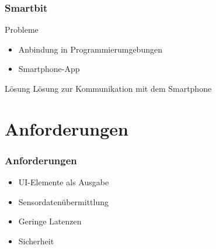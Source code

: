 \documentclass{beamer}
\begin{document}
\begin{frame}
    \frametitle{Smartbit}
    \begin{alertblock}{Probleme}
        \begin{itemize}
            \item Anbindung in Programmierumgebungen
            \item Smartphone-App
        \end{itemize}
    \end{alertblock}
    \begin{block}{Lösung}
        Lösung zur Kommunikation mit dem Smartphone
    \end{block}
\end{frame}

\section{Anforderungen}
\begin{frame}
    \frametitle{Anforderungen}
    \begin{itemize}
        \item UI-Elemente als Ausgabe
        \item Sensordatenübermittlung
        \item Geringe Latenzen
        \item Sicherheit
    \end{itemize}
\end{frame}
\end{document}
